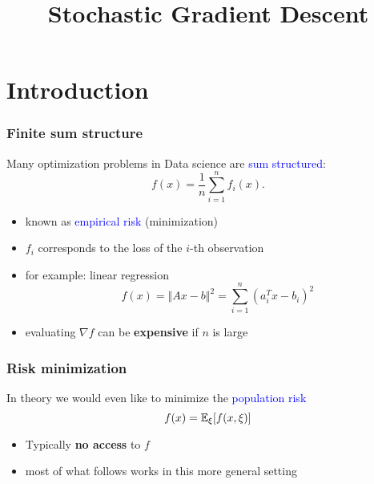 \documentclass[aspectratio=149]{beamer}
\title{Stochastic Gradient Descent}
\begin{document}
\maketitle
{}

\section{Introduction}%
\label{sec:}

\begin{frame}
  \frametitle{Finite sum structure}

  Many optimization problems in Data science are \textcolor{blue}{sum structured}:
  \begin{equation}
    f(x) = \frac{1}{n} \sum_{i=1}^{n} f_i(x).
  \end{equation}

  \begin{itemize}
    \item known as \textcolor{blue}{empirical risk} (minimization)
    \item $f_i$ corresponds to the loss of the $i$-th observation
    \item for example: linear regression
          \begin{equation}
            f(x) = \Vert Ax-b \Vert^2 = \sum_{i=1}^{n} {(a_i^T x -b_i)}^2
          \end{equation}
    \item evaluating $\nabla f$ can be \textbf{expensive} if $n$ is large
  \end{itemize}

\end{frame}


\begin{frame}
  \frametitle{Risk minimization}
  In theory we would even like to minimize the \textcolor{blue}{population risk}
  \begin{equation}
    f(x) = \mathbb{E}_\xi [ f(x, \xi) ]
  \end{equation}
  \begin{itemize}
    \item Typically \textbf{no access} to $f$
    \item most of what follows works in this more general setting
  \end{itemize}
\end{frame}
\end{document}
